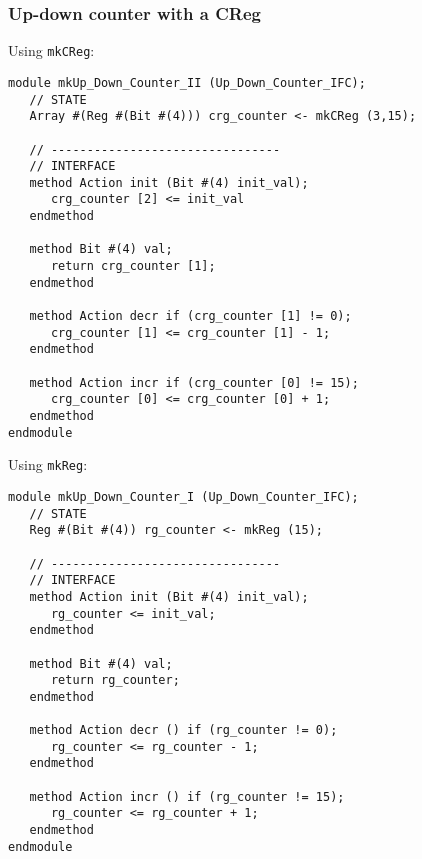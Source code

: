 \begin{frame}[fragile]
\frametitle{Up-down counter with a CReg}

\footnotesize

\begin{minipage}[t]{0.5\textwidth}\scriptsize
Using {\tt mkCReg}:
\begin{Verbatim}[frame=single]
module mkUp_Down_Counter_II (Up_Down_Counter_IFC);
   // STATE
   Array #(Reg #(Bit #(4))) crg_counter <- mkCReg (3,15);

   // --------------------------------
   // INTERFACE
   method Action init (Bit #(4) init_val);
      crg_counter [2] <= init_val
   endmethod

   method Bit #(4) val;
      return crg_counter [1];
   endmethod

   method Action decr if (crg_counter [1] != 0);
      crg_counter [1] <= crg_counter [1] - 1;
   endmethod

   method Action incr if (crg_counter [0] != 15);
      crg_counter [0] <= crg_counter [0] + 1;
   endmethod
endmodule
\end{Verbatim}
\end{minipage}
\hm
\begin{minipage}[t]{0.45\textwidth}\scriptsize
Using {\tt mkReg}:
\begin{Verbatim}[frame=single]
module mkUp_Down_Counter_I (Up_Down_Counter_IFC);
   // STATE
   Reg #(Bit #(4)) rg_counter <- mkReg (15);

   // --------------------------------
   // INTERFACE
   method Action init (Bit #(4) init_val);
      rg_counter <= init_val;
   endmethod

   method Bit #(4) val;
      return rg_counter;
   endmethod

   method Action decr () if (rg_counter != 0);
      rg_counter <= rg_counter - 1;
   endmethod

   method Action incr () if (rg_counter != 15);
      rg_counter <= rg_counter + 1;
   endmethod
endmodule
\end{Verbatim}
\end{minipage}

\end{frame}


